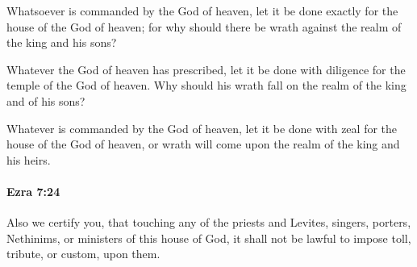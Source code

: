 			\begin{versebox}
					\item[BHS] 
					\item[LXX] 
					\item[ASV] Whatsoever is commanded by the God of heaven, let it be done exactly for the house of the God of heaven; for why should there be wrath against the realm of the king and his sons?
					\item[NIV] Whatever the God of heaven has prescribed, let it be done with diligence for the temple of the God of heaven. Why should his wrath fall on the realm of the king and of his sons?
					\item[NRSV] Whatever is commanded by the God of heaven, let it be done with zeal for the house of the God of heaven, or wrath will come upon the realm of the king and his heirs.
			\end{versebox}

		\paragraph{Ezra 7:24} %
			\label{EZRA-7-24}

			Also we certify you, that touching any of the priests and Levites, singers, porters, Nethinims, or ministers of this house of God, it shall not be lawful to impose toll, tribute, or custom, upon them.

